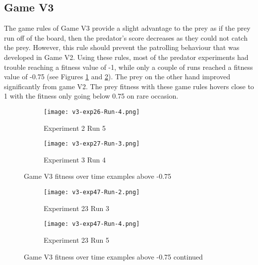 \subsection{Game V3}
The game rules of Game V3 provide a slight advantage to the prey as if the prey run off of the board, then the predator's score decreases as they could not catch the prey. However, this rule should prevent the patrolling behaviour that was developed in Game V2. Using these rules, most of the predator experiments had trouble reaching a fitness value of -1, while only a couple of runs reached a fitness value of -0.75 (see Figures \ref{fig:v3-pred-runs} and \ref{fig:v3-pred-runs-2}). The prey on the other hand improved significantly from game V2. The prey fitness with these game rules hovers close to 1 with the fitness only going below 0.75 on rare occasion. 


\begin{figure}
  \centering
  \begin{subfigure}{0.7\textwidth}
    \centering
    \texttt{[image: v3-exp26-Run-4.png]}
    \caption{Experiment 2 Run 5}
  \end{subfigure}
  \begin{subfigure}{0.7\textwidth}
    \centering
    \texttt{[image: v3-exp27-Run-3.png]}
    \caption{Experiment 3 Run 4}
  \end{subfigure}
    \caption{Game V3 fitness over time examples above -0.75\label{fig:v3-pred-runs}}
\end{figure}




\begin{figure}
  \centering
    \begin{subfigure}{0.7\textwidth}
    \centering
    \texttt{[image: v3-exp47-Run-2.png]}
    \caption{Experiment 23 Run 3}
  \end{subfigure}
  \begin{subfigure}{0.7\textwidth}
    \centering
    \texttt{[image: v3-exp47-Run-4.png]}
    \caption{Experiment 23 Run 5}
  \end{subfigure}
  \caption{Game V3 fitness over time examples above -0.75 continued\label{fig:v3-pred-runs-2}}
\end{figure}

